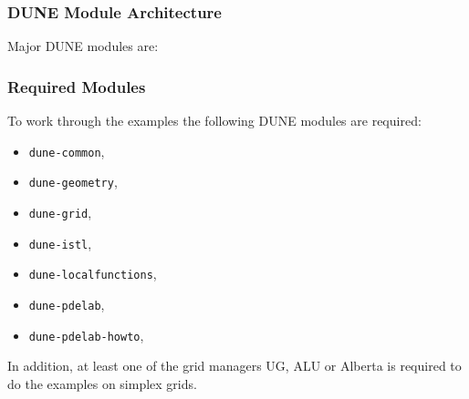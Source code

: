 \begin{frame}
\frametitle<presentation>{DUNE Module Architecture}
Major DUNE modules are:
\begin{center}
\end{center}
\end{frame}

\begin{frame}
\frametitle<presentation>{Required Modules}
To work through the examples the following DUNE modules are required: 
\begin{itemize}
\item \lstinline{dune-common},
\item \lstinline{dune-geometry},
\item \lstinline{dune-grid},
\item \lstinline{dune-istl},
\item \lstinline{dune-localfunctions},
\item \lstinline{dune-pdelab},
\item \lstinline{dune-pdelab-howto},
\end{itemize}

In addition, at least one of the grid managers UG, ALU or Alberta is
required to do the examples on simplex grids. 
\end{frame}



